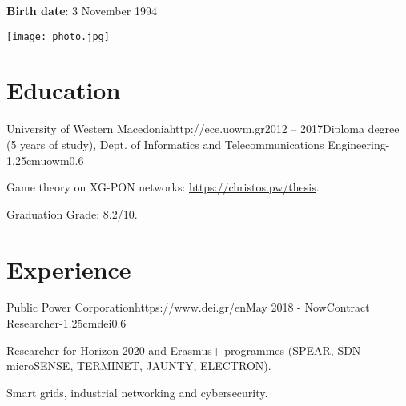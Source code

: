 \documentclass{mycv}
\begin{document}
	\thispagestyle{plain}
	\begin{minipage}{.7\textwidth}
		\begin{flushleft}
			\centering
			{\bf Birth date}: 3 November 1994
		\end{flushleft}
	\end{minipage}
	\begin{minipage}{.3\textwidth}
		\begin{flushright}
			\texttt{[image: photo.jpg]}
		\end{flushright}
	\end{minipage}
	\vspace*{-0.75cm}
	\section{Education}
	
	\begin{EntryDatedLogo}{University of Western Macedonia}{http://ece.uowm.gr}{2012 -- 2017}{Diploma degree (5 years of study), Dept. of Informatics and Telecommunications Engineering}{-1.25cm}{uowm}{0.6}
		\begin{Itemize}
			\item Game theory on XG-PON networks: \url{https://christos.pw/thesis}.
			\item Graduation Grade: 8.2/10.
		\end{Itemize}
	\end{EntryDatedLogo}
	
	\section{Experience}
		\begin{EntryDatedLogo}{Public Power Corporation}{https://www.dei.gr/en}{May 2018 - Now}{Contract Researcher}{-1.25cm}{dei}{0.6}
		\begin{Itemize}
			\item Researcher for Horizon 2020 and Erasmus+ programmes (SPEAR, SDN-microSENSE, TERMINET, JAUNTY, ELECTRON).
			\item Smart grids, industrial networking and cybersecurity.
		\end{Itemize}
	\end{EntryDatedLogo}
	
\end{document}
